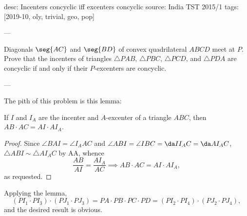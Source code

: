 desc: Incenters concyclic iff excenters concyclic
source: India TST 2015/1
tags: [2019-10, oly, trivial, geo, pop]

---

Diagonals $\seg{AC}$ and $\seg{BD}$ of convex quadrilateral $ABCD$ meet at $P$. Prove that the incenters of triangles $\triangle PAB$, $\triangle PBC$, $\triangle PCD$, and $\triangle PDA$ are concyclic if and only if their $P$-excenters are concyclic.

---

The pith of this problem is this lemma:
\begin{boxlemma*}
    If $I$ and $I_A$ are the incenter and $A$-excenter of a triangle $ABC$, then $AB\cdot AC=AI\cdot AI_A$.
\end{boxlemma*}
\begin{proof}
    Since $\angle BAI=\angle I_AAC$ and $\angle ABI=\angle IBC=\da II_AC=\da AI_AC$, $\triangle ABI\sim\triangle AI_AC$ by AA, whence \[\frac{AB}{AI}=\frac{AI_A}{AC}\implies AB\cdot AC=AI\cdot AI_A,\]
    as requested.
\end{proof}

Applying the lemma, \[(PI_1\cdot PI_3)\cdot(PJ_1\cdot PJ_3)=PA\cdot PB\cdot PC\cdot PD=(PI_2\cdot PI_4)\cdot(PJ_2\cdot PJ_4),\]
and the desired result is obvious.
